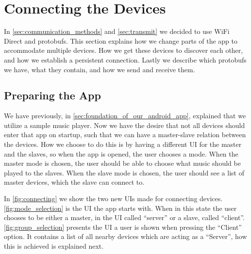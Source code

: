 \section{Connecting the Devices}
In \cref{sec:communication_methods} and \cref{sec:transmit} we decided to use WiFi Direct and protobufs.
This section explains how we change parts of the app to accommodate multiple devices.
How we get these devices to discover each other, and how we establish a persistent connection.
Lastly we describe which protobufs we have, what they contain, and how we send and receive them.

\subsection{Preparing the App}
We have previously, in \cref{sec:foundation_of_our_android_app}, explained that we utilize a sample music player.
Now we have the desire that not all devices should enter that app on startup, such that we can have a master-slave relation between the devices.
How we choose to do this is by having a different UI for the master and the slaves, so when the app is opened, the user chooses a mode.
When the master mode is chosen, the user should be able to choose what music should be played to the slaves.
When the slave mode is chosen, the user should see a list of master devices, which the slave can connect to. 

In \cref{fig:connecting} we show the two new UIs made for connecting devices.
\cref{fig:mode_selection} is the UI the app starts with.
When in this state the user chooses to be either a master, in the UI called ``server'' or a slave, called ``client''.
\cref{fig:group_selection} presents the UI a user is shown when pressing the ``Client'' option.
It contains a list of all nearby devices which are acting as a ``Server'', how this is achieved is explained next.

